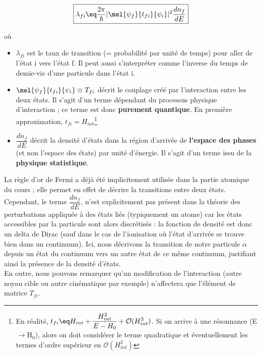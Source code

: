 \begin{minipage}{.3\textwidth}
  \vspace{-6.1cm}
  \begin{equation*}
  \boxed{
    \lambda_{fi} \eq
    \frac{2\pi}{\hbar }|\mel{\psi_f}{t_{fi}}{\psi_i}|^2 \dfrac{dn_f}{dE}
    \label{fermi}
   }
   \end{equation*}
\end{minipage} 
\begin{minipage}[t]{.035\textwidth}
  \vspace{-3.3cm}
  où
\end{minipage}
\begin{minipage}{.59\textwidth}
  \begin{itemize}[label=$\bullet$]
      \item $\lambda_{fi}$ est le taux de transition (= probabilité par unité de temps) pour aller de l'état i vers l'état f. Il peut aussi s'interpréter comme l'inverse du temps de demie-vie d'une particule dans l'état i.
      \item $\mel{\psi_f}{t_{fi}}{\psi_i} \equiv T_{fi}$ décrit le couplage créé par l'interaction entre les deux états. Il s'agit d'un terme dépendant du processus physique d'interaction ; ce terme est donc \textbf{purement quantique}. En première approximation, $t_{fi} = H_{int}$\footnote{En réalité, $t_{fi} \eq H_{int} + \dfrac{H_{int}^2}{E-H_0} + \mathcal{O}(H_{int}^3) $. Si on arrive à une résonnance (E$\rightarrow$H$_0$), alors on doit considérer le terme quadratique et éventuellement les termes d'ordre supérieur en $\mathcal{O}(H_{int}^2)$ }
      \item $\dfrac{dn_f}{dE}$ décrit la densité d'états dans la région d'arrivée de \textbf{l'espace des phases} (et non l'espace des états) par unité d'énergie. Il s'agit d'un terme issu de la \textbf{physique statistique}.
  \end{itemize}
\end{minipage}
\vspace{0.2cm}

La règle d'or de Fermi a déjà été implicitement utilisée dans la partie atomique du cours ; elle permet en effet de décrire la transitions entre deux états. Cependant, le terme $\dfrac{dn_f}{dE}$, n'est explicitement pas présent dans la théorie des perturbations appliquée à des états liés (typiquement un atome) car les états accessibles par la particule sont alors discrétisés : la fonction de densité est donc un delta de Dirac (sauf dans le cas de l'ionisation où l'état d'arrivée se trouve bien dans un continuum). Ici, nous décrivons la transition de notre particule $\alpha$ depuis un état du continuum vers un autre état de ce même continuum, justifiant ainsi la présence de la densité d'états.\\
En outre, nous pouvons remarquer qu'un modification de l'interaction (autre noyau cible ou autre cinématique par exemple) n'affectera que l'élément de matrice $T_{fi}$.\\

